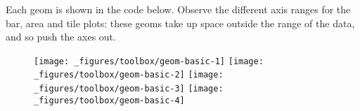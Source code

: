 Each geom is shown in the code below. Observe the different axis ranges
for the bar, area and tile plots: these geoms take up space outside the
range of the data, and so push the axes out.

\begin{Shaded}
\begin{Highlighting}[]
\StringTok{ }\NormalTok{(}
   \NormalTok{(}\NormalTok{, }\NormalTok{, }\NormalTok{), }
   \NormalTok{(}\NormalTok{, }\NormalTok{, }\NormalTok{), }
   \NormalTok{(}\NormalTok{,}\NormalTok{,}\NormalTok{)}
\NormalTok{)}
\StringTok{ } \StringTok{ }
\StringTok{  }\NormalTok{(} \NormalTok{, } \NormalTok{) +}\StringTok{ }
\StringTok{  }\NormalTok{(} \NormalTok{(} \NormalTok{)) }
\StringTok{ }\NormalTok{() +}\StringTok{ }\NormalTok{(}\NormalTok{)}
\StringTok{ }\NormalTok{() +}\StringTok{ }\NormalTok{(}\NormalTok{)}
\StringTok{ }\NormalTok{(} \NormalTok{) +}\StringTok{ }\NormalTok{(}\NormalTok{)}
\StringTok{ }\NormalTok{() +}\StringTok{ }\NormalTok{(}\NormalTok{)}
\end{Highlighting}
\end{Shaded}

\begin{figure}[H]
  \texttt{[image: \_figures/toolbox/geom-basic-1]}%
  \texttt{[image: \_figures/toolbox/geom-basic-2]}%
  \texttt{[image: \_figures/toolbox/geom-basic-3]}%
  \texttt{[image: \_figures/toolbox/geom-basic-4]}
\end{figure}

